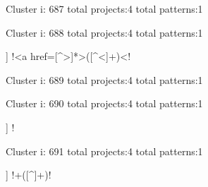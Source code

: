 Cluster i: 687
total projects:4
total patterns:1
\begin{multicols}{1}
\end{multicols}







Cluster i: 688
total projects:4
total patterns:1
\begin{multicols}{1}
\begin{description}[noitemsep,topsep=0pt]
\item [[4] ] \cverb!<a href=[^>]*>([^<]+)<!
\end{description}
\end{multicols}







Cluster i: 689
total projects:4
total patterns:1
\begin{multicols}{1}
\begin{description}[noitemsep,topsep=0pt]
\item [[4] ] \cverb!^[a-zA-Z0-9_]+\.[ch]$!
\end{description}
\end{multicols}







Cluster i: 690
total projects:4
total patterns:1
\begin{multicols}{1}
\begin{description}[noitemsep,topsep=0pt]
\item [[4] ] \cverb!%
\end{description}
\end{multicols}







Cluster i: 691
total projects:4
total patterns:1
\begin{multicols}{1}
\begin{description}[noitemsep,topsep=0pt]
\item [[4] ] \cverb!\sSONAME\s+([^\s]+)!
\end{description}
\end{multicols}








